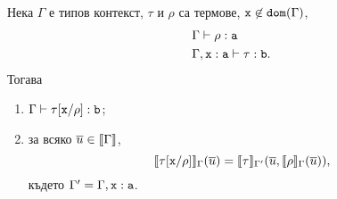 \begin{framed}
\begin{lemma}\label{lem:pcf:substitution}
  Нека $\Gamma$ е типов контекст, $\tau$ и $\rho$ са термове, $\texttt{x} \not\in \texttt{dom}(\Gamma)$,
  \begin{align*}
    & \Gamma \vdash \rho : \texttt{a}\\
    & \Gamma, \texttt{x}:\texttt{a} \vdash \tau : \texttt{b}.
  \end{align*}
  Тогава
  \begin{enumerate}[1)]
  \item
    $\Gamma \vdash \tau[\texttt{x}/{\rho}] : \texttt{b}$;
  \item
    за всяко $\overline{u} \in \llbracket{\Gamma}\rrbracket$,
    \[\llbracket{\tau[\texttt{x}/{\rho}]}\rrbracket_\Gamma(\overline{u}) = \llbracket{\tau}\rrbracket_{\Gamma'}(\overline{u},\llbracket{\rho}\rrbracket_\Gamma(\overline{u})),\]
    където $\Gamma' = \Gamma, \texttt{x}:\texttt{a}$.  
  \end{enumerate}
\end{lemma}
\end{framed}

